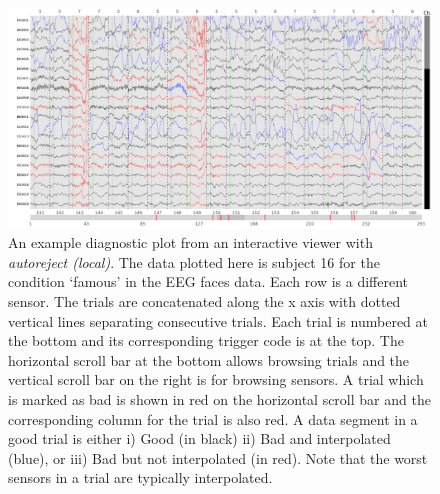 \clearpage
\begin{figure}
	\centering
	\includegraphics[width=\textwidth]{figures/figure8.pdf}
    \caption[An example diagnostic plot from an interactive viewer with \emph{autoreject (local)}]{An example diagnostic plot from an interactive viewer with \emph{autoreject (local)}. The data plotted here is subject 16 for the condition `famous' in the EEG faces data. Each row is a different sensor. The trials are concatenated along the x axis with dotted vertical lines separating consecutive trials. Each trial is numbered at the bottom and its corresponding trigger code is at the top. The horizontal scroll bar at the bottom allows browsing trials and the vertical scroll bar on the right is for browsing sensors. A trial which is marked as bad is shown in red on the horizontal scroll bar and the corresponding column for the trial is also red. A data segment in a good trial is either i) Good (in black) ii) Bad and interpolated (blue), or iii) Bad but not interpolated (in red). Note that the worst sensors in a trial are typically interpolated.}
    \label{fig:diagnostic_plot}
\end{figure}
\clearpage

%
%
%

%
%
%
%
%

%
%

%

%
%
%
%
%
%
%
%
%

%
%
%
%

%
%
%
%

%

%

%
%
%
%
%
%
%

%

%
%

%
%
%

%
